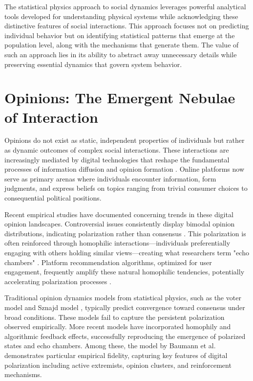 The statistical physics approach to social dynamics leverages powerful analytical tools developed for understanding physical systems while acknowledging these distinctive features of social interactions. This approach focuses not on predicting individual behavior but on identifying statistical patterns that emerge at the population level, along with the mechanisms that generate them. The value of such an approach lies in its ability to abstract away unnecessary details while preserving essential dynamics that govern system behavior.

\section{Opinions: The Emergent Nebulae of Interaction}

Opinions do not exist as static, independent properties of individuals but rather as dynamic outcomes of complex social interactions. These interactions are increasingly mediated by digital technologies that reshape the fundamental processes of information diffusion and opinion formation \cite{social-media-as-public-opinion}. Online platforms now serve as primary arenas where individuals encounter information, form judgments, and express beliefs on topics ranging from trivial consumer choices to consequential political positions.

Recent empirical studies have documented concerning trends in these digital opinion landscapes. Controversial issues consistently display bimodal opinion distributions, indicating polarization rather than consensus \cite{biased-assimilation-and-attitude-polarization, paritisans-without-constrait-political-polarization-and-trends}. This polarization is often reinforced through homophilic interactions—individuals preferentially engaging with others holding similar views—creating what researchers term "echo chambers" \cite{echo-chambers-online, echo-chambers-emotional-contagion-and-group-polarization-on-facebook, quantifying-echo-chamber-effects-in-information-spreading-over-political-communication}. Platform recommendation algorithms, optimized for user engagement, frequently amplify these natural homophilic tendencies, potentially accelerating polarization processes \cite{link-recommendation-algorithms-and-dynamics-of-polarization-in-social-networks}.

Traditional opinion dynamics models from statistical physics, such as the voter model \cite{the-voter-model, reality-inspired-voter-models-a-mini-review} and Sznajd model \cite{opinion-evolution-in-closed-community, sznajd-review}, typically predict convergence toward consensus under broad conditions. These models fail to capture the persistent polarization observed empirically. More recent models have incorporated homophily and algorithmic feedback effects, successfully reproducing the emergence of polarized states and echo chambers. Among these, the model by Baumann et al. \cite{modeling-echo-chambers-and-polarizaiton-dynamics-in-social-networks} demonstrates particular empirical fidelity, capturing key features of digital polarization including active extremists, opinion clusters, and reinforcement mechanisms.

